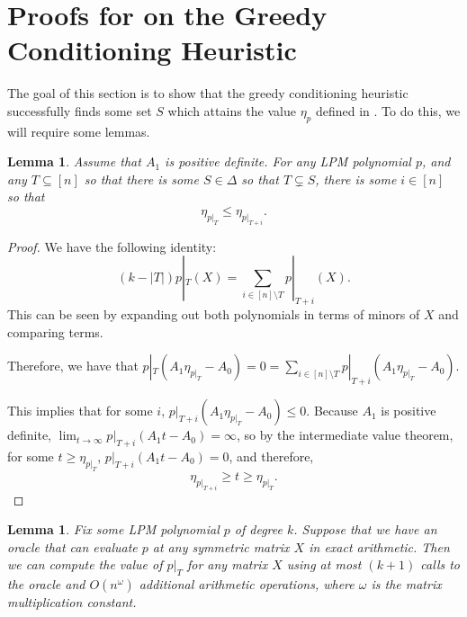 \documentclass{amsart}
\newtheorem{lemma}[theorem]{Lemma}
\theoremstyle{definition}
\begin{document}
\section{Proofs for  on the Greedy Conditioning Heuristic}
The goal of this section is to show that the greedy conditioning heuristic successfully finds some set $S$ which attains the value $\eta_p$ defined in .
To do this, we will require some lemmas.
\begin{lemma}
    \label{lem:increasing}
    Assume that $A_1$ is positive definite.
    For any LPM polynomial $p$, and any $T \subseteq [n]$ so that there is some $S \in \Delta$ so that $T \subsetneq S$, there is some $i \in [n]$ so that
    \[
        \eta_{p|_{T}} \le \eta_{p|_{T + i}}.
    \]
\end{lemma}
\begin{proof}
    We have the following identity:
    \[
        (k - |T|) p|_T(X) = \sum_{i \in [n] \setminus T} p|_{T + i}(X).
    \]
    This can be seen by expanding out both polynomials in terms of minors of $X$ and comparing terms.

    Therefore, we have that $p|_T(A_1 \eta_{p|_T} - A_0) = 0 = \sum_{i \in [n] \setminus T} p|_{T + i}(A_1 \eta_{p|_T} - A_0)$.

    This implies that for some $i$, $p|_{T + i}(A_1 \eta_{p|_T} - A_0) \le 0$. Because $A_1$ is positive definite, $\lim_{t \rightarrow \infty}  p|_{T + i}(A_1 t - A_0) = \infty$, so by the intermediate value theorem, for some $t \ge \eta_{p|_T}$, $p|_{T + i}(A_1 t - A_0) = 0$, and therefore,
    \[
        \eta_{p|_{T + i}} \ge t \ge \eta_{p|_T}.
    \]
\end{proof}
\begin{lemma}
    \label{lem:new_oracle}
    Fix some LPM polynomial $p$ of degree $k$.
    Suppose that we have an oracle that can evaluate $p$ at any symmetric matrix $X$ in exact arithmetic.
    Then we can compute the value of $p|_T$ for any matrix $X$ using at most $(k+1)$ calls to the oracle and $O(n^{\omega})$ additional arithmetic operations, where $\omega$ is the matrix multiplication constant.
\end{lemma}
\end{document}
